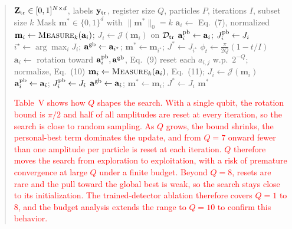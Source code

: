 \documentclass[11pt]{article}
\newenvironment{excerpt}{\begin{quote}\sloppy}{\end{quote}}
\begin{document}
\begin{excerpt}
\setcounter{algorithm}{0}
\begin{algorithm}[H]
\caption{\textcolor{black}{Variable-qubit QPSO feature
selection. Steps commented with Q are the only ones that depend on
the register size.}}

\color{black}
\small
\begin{algorithmic}[1]
\Require $\mathbf{Z}_{\rm tr}\in[0,1]^{N\times d}$, labels $\mathbf{y}_{\rm tr}$, register size $Q$, particles $P$, iterations $I$, subset size $k$
\Ensure Mask $\mathbf{m}^{*}\in\{0,1\}^{d}$ with $\|\mathbf{m}^{*}\|_0=k$
  \State $\mathbf{a}_i\gets$ Eq.~(7), normalized 
  \State $\mathbf{m}_i\gets\textsc{Measure}_k(\mathbf{a}_i)$; $J_i\gets\mathcal{J}(\mathbf{m}_i)$ on $\mathcal{D}_{\rm tr}$
  \State $\mathbf{a}_i^{\rm pb}\gets\mathbf{a}_i$; $J_i^{\rm pb}\gets J_i$
\EndFor
\State $i^{\star}\gets\arg\max_i J_i$; $\mathbf{a}^{\rm gb}\gets\mathbf{a}_{i^{\star}}$; $\mathbf{m}^{*}\gets\mathbf{m}_{i^{\star}}$; $J^{*}\gets J_{i^{\star}}$
  \State $\phi_t\gets\frac{\pi}{2Q}(1-t/I)$ 
    \State $\mathbf{a}_i\gets$ rotation toward $\mathbf{a}_i^{\rm pb},\mathbf{a}^{\rm gb}$, Eq.~(9)
    \State reset each $a_{i,j}$ w.p.\ $2^{-Q}$; normalize, Eq.~(10) 
    \State $\mathbf{m}_i\gets\textsc{Measure}_k(\mathbf{a}_i)$, Eq.~(11); $J_i\gets\mathcal{J}(\mathbf{m}_i)$
      \State $\mathbf{a}_i^{\rm pb}\gets\mathbf{a}_i$; $J_i^{\rm pb}\gets J_i$
    \EndIf
      \State $\mathbf{a}^{\rm gb}\gets\mathbf{a}_i$; $\mathbf{m}^{*}\gets\mathbf{m}_i$; $J^{*}\gets J_i$
    \EndIf
  \EndFor
\EndFor
\State \Return $\mathbf{m}^{*}$ 
\end{algorithmic}
\end{algorithm}

\textcolor{red}{Table~V shows
how $Q$ shapes the search. With a single qubit, the rotation bound is
$\pi/2$ and half of all amplitudes are reset at every iteration, so
the search is close to random sampling. As $Q$ grows, the bound
shrinks, the personal-best term dominates the update, and from $Q=7$
onward fewer than one amplitude per particle is reset at each
iteration. $Q$ therefore
moves the search from exploration to exploitation, with a risk of
premature convergence at large $Q$ under a finite budget. Beyond
$Q=8$, resets are rare and the pull toward the global best is weak,
so the search stays close to its initialization. The trained-detector
ablation therefore covers $Q=1$ to $8$, and the budget analysis
extends the range to $Q=10$ to confirm this behavior.}


\end{excerpt}
\end{document}
